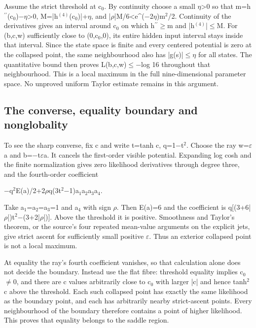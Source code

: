 \documentclass[11pt,a4paper]{article}
\begin{document}
Assume the strict threshold at c\ensuremath{_0}. By continuity choose a small \ensuremath{\eta}>0 so that m=h\ensuremath{^{\prime\prime}}(c\ensuremath{_0})\ensuremath{-}\ensuremath{\eta}>0, M=|h\ensuremath{^{(4)}}(c\ensuremath{_0})|+\ensuremath{\eta}, and |\ensuremath{\rho}|M/6<e\textasciicircum{}(\ensuremath{-}2\ensuremath{\eta})m\ensuremath{^2}/2. Continuity of the derivatives gives an interval around c\ensuremath{_0} on which h\ensuremath{^{\prime\prime}}\ensuremath{\geq}m and |h\ensuremath{^{(4)}}|\ensuremath{\leq}M. For (b,c,w) sufficiently close to (0,c\ensuremath{_0},0), its entire hidden input interval stays inside that interval. Since the state space is finite and every centered potential is zero at the collapsed point, the same neighbourhood also has |g(s)|\ensuremath{\leq}\ensuremath{\eta} for all states. The quantitative bound then proves L(b,c,w)\ensuremath{\leq}\ensuremath{-}log 16 throughout that neighbourhood. This is a local maximum in the full nine-dimensional parameter space. No unproved uniform Taylor estimate remains in this argument.

\subsection{The converse, equality boundary and nonglobality}
To see the sharp converse, fix c and write t=tanh c, q=1\ensuremath{-}t\ensuremath{^2}. Choose the ray w=\ensuremath{\varepsilon}a and b=\ensuremath{-}t\ensuremath{\varepsilon}a. It cancels the first-order visible potential. Expanding log cosh and the finite normalization gives zero likelihood derivatives through degree three, and the fourth-order coefficient

\ensuremath{-}q\ensuremath{^2}E(a)/2+2\ensuremath{\rho}q(3t\ensuremath{^2}\ensuremath{-}1)a\ensuremath{_1}a\ensuremath{_2}a\ensuremath{_3}a\ensuremath{_4}.

Take a\ensuremath{_1}=a\ensuremath{_2}=a\ensuremath{_3}=1 and a\ensuremath{_4} with sign \ensuremath{\rho}. Then E(a)=6 and the coefficient is q[(3+6|\ensuremath{\rho}|)t\ensuremath{^2}\ensuremath{-}(3+2|\ensuremath{\rho}|)]. Above the threshold it is positive. Smoothness and Taylor's theorem, or the source's four repeated mean-value arguments on the explicit jets, give strict ascent for sufficiently small positive \ensuremath{\varepsilon}. Thus an exterior collapsed point is not a local maximum.

At equality the ray's fourth coefficient vanishes, so that calculation alone does not decide the boundary. Instead use the flat fibre: threshold equality implies c\ensuremath{_0}\ensuremath{\neq}0, and there are c values arbitrarily close to c\ensuremath{_0} with larger |c| and hence tanh\ensuremath{^2}c above the threshold. Each such collapsed point has exactly the same likelihood as the boundary point, and each has arbitrarily nearby strict-ascent points. Every neighbourhood of the boundary therefore contains a point of higher likelihood. This proves that equality belongs to the saddle region.
\end{document}
